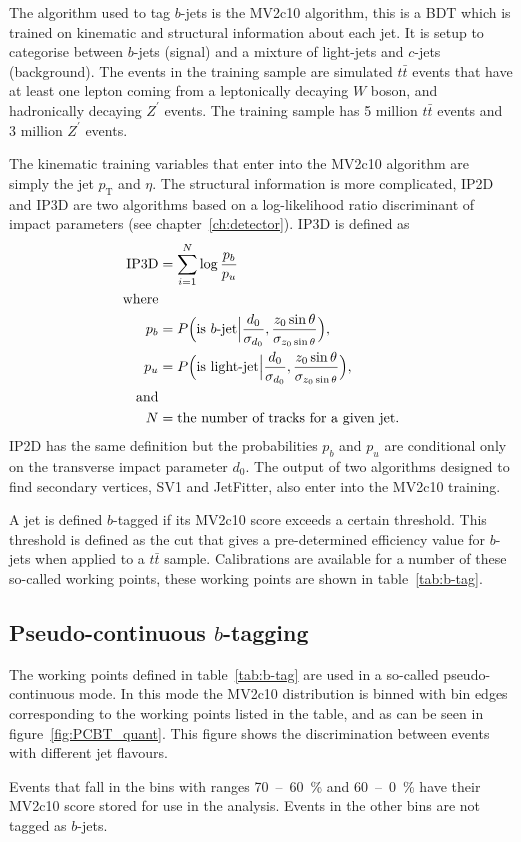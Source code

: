 The algorithm used to tag $b$-jets is the MV2c10 algorithm, this is a BDT which is
trained on kinematic and structural information about each jet. It is setup to
categorise between $b$-jets (signal) and a mixture of light-jets and $c$-jets
(background). The events in the training sample are simulated $t\bar{t}$ events
that have at least one lepton coming from a leptonically decaying $W$ boson, and
hadronically decaying $Z^\prime$ events. The training sample has 5 million
$t\bar{t}$ events and 3 million $Z^\prime$ events.

The kinematic training variables that enter into the MV2c10 algorithm are simply
the jet $p_{\mathrm{T}}$ and $\eta$. The structural information is more complicated, IP2D
and IP3D are two algorithms based on a log-likelihood ratio discriminant of
impact parameters (see chapter~\ref{ch:detector}). IP3D is defined as
\begin{align}
  \text{IP3D} &=\sum_{i=1}^{N}\log{\frac{p_b}{p_u}} \\
  \text{where}& \notag \\
  p_b &= P\Big(\text{is }b\text{-jet} \Big\vert \frac{d_0}{\sigma_{d_0}},
        \frac{z_0 \sin{\theta}}{\sigma_{z_0\sin{\theta}}}\Big),\\
  p_u &= P\Big(\text{is light-jet} \Big\vert \frac{d_0}{\sigma_{d_0}},
        \frac{z_0 \sin{\theta}}{\sigma_{z_0\sin{\theta}}}\Big),\\
  \text{and} & \notag \\
  N &= \text{the number of tracks for a given jet.} \notag
\end{align}
IP2D has the same definition but the probabilities $p_b$ and $p_u$ are
conditional only on the transverse impact parameter $d_0$. The output of two
algorithms designed to find secondary vertices, SV1 and JetFitter, also enter
into the MV2c10 training.

A jet is defined $b$-tagged if its MV2c10 score exceeds a certain threshold. This
threshold is defined as the cut that gives a pre-determined efficiency value for
$b$-jets when applied to a $t\bar{t}$ sample. Calibrations are available for a
number of these so-called working points, these working points are shown in
table~\ref{tab:b-tag}.


\subsection{Pseudo-continuous $b$-tagging}
The working points defined in table~\ref{tab:b-tag} are used in a so-called
pseudo-continuous mode. In this mode the MV2c10 distribution is binned with bin
edges corresponding to the working points listed in the table, and as can be
seen in figure~\ref{fig:PCBT_quant}. This figure shows the discrimination between
events with different jet flavours. 

Events that fall in the bins with ranges 70~--~60~\% and 60~--~0~\% have their
MV2c10 score stored for use in the analysis. Events in the other bins are not
tagged as $b$-jets.

